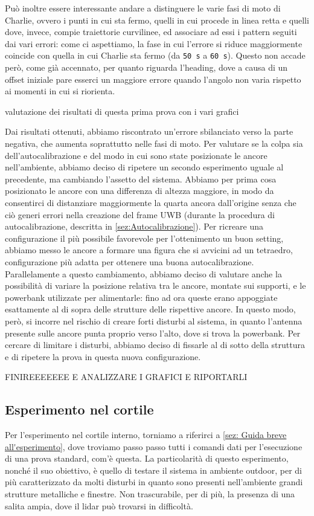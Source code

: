 Può inoltre essere interessante andare a distinguere le varie fasi di moto di Charlie, ovvero i punti in cui sta fermo, quelli in cui procede in linea retta e quelli dove, invece, compie traiettorie curvilinee, ed associare ad essi i pattern seguiti dai vari errori: come ci aspettiamo, la fase in cui l'errore si riduce maggiormente coincide con quella in cui Charlie sta fermo (da \verb|50 s| a \verb|60 s|). Questo non accade però, come già accennato, per quanto riguarda l'heading, dove a causa di un offset iniziale pare esserci un maggiore errore quando l'angolo non varia rispetto ai momenti in cui si riorienta.

valutazione dei risultati di questa prima prova con i vari grafici

Dai risultati ottenuti, abbiamo riscontrato un'errore sbilanciato verso la parte negativa, che aumenta soprattutto nelle fasi di moto. Per valutare se la colpa sia dell'autocalibrazione e del modo in cui sono state posizionate le ancore nell'ambiente, abbiamo deciso di ripetere un secondo esperimento uguale al precedente, ma cambiando l'assetto del sistema. Abbiamo per prima cosa posizionato le ancore con una differenza di altezza maggiore, in modo da consentirci di distanziare maggiormente la quarta ancora dall'origine senza che ciò generi errori nella creazione del frame UWB (durante la procedura di autocalibrazione, descritta in \ref{sez:Autocalibrazione}). Per ricreare una configurazione il più possibile favorevole per l'ottenimento un buon setting, abbiamo messo le ancore a formare una figura che si avvicini ad un tetraedro, configurazione più adatta per ottenere una buona autocalibrazione.
Parallelamente a questo cambiamento, abbiamo deciso di valutare anche la possibilità di variare la posizione relativa tra le ancore, montate sui supporti, e le powerbank utilizzate per alimentarle: fino ad ora queste erano appoggiate esattamente al di sopra delle strutture delle rispettive ancore. In questo modo, però, si incorre nel rischio di creare forti disturbi al sistema, in quanto l'antenna presente sulle ancore punta proprio verso l'alto, dove si trova la powerbank. Per cercare di limitare i disturbi, abbiamo deciso di fissarle al di sotto della struttura e di ripetere la prova in questa nuova configurazione.

FINIREEEEEEE E ANALIZZARE I GRAFICI E RIPORTARLI 
\subsection{Esperimento nel cortile}
Per l'esperimento nel cortile interno, torniamo a riferirci a \ref{sez: Guida breve all'esperimento}, dove troviamo passo passo tutti i comandi dati per l'esecuzione di una prova standard, com'è questa.
La particolarità di questo esperimento, nonché il suo obiettivo, è quello di testare il sistema in ambiente outdoor, per di più caratterizzato da molti disturbi in quanto sono presenti nell'ambiente grandi strutture metalliche e finestre. Non trascurabile, per di più, la presenza di una salita ampia, dove il lidar può trovarsi in difficoltà.

